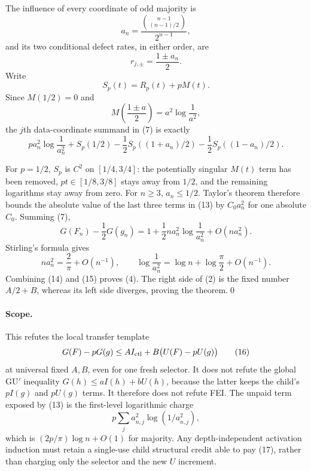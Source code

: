 The influence of every coordinate of odd majority is
\[
 a_n=\frac{\binom{n-1}{(n-1)/2}}{2^{n-1}},            \tag{10}
\]
and its two conditional defect rates, in either order, are
\[
 r_{j,\pm}=\frac{1\pm a_n}{2}.                        \tag{11}
\]
Write
\[
 S_p(t)=R_p(t)+pM(t).
\]
Since $M(1/2)=0$ and
\[
 M\left(\frac{1\pm a}{2}\right)
 =a^2\log\frac1{a^2},                                 \tag{12}
\]
the $j$th data-coordinate summand in (7) is exactly
\[
 p a_n^2\log\frac1{a_n^2}
 +S_p(1/2)-\frac12S_p((1+a_n)/2)-\frac12S_p((1-a_n)/2). \tag{13}
\]

For $p=1/2$, $S_p$ is $C^2$ on $[1/4,3/4]$: the potentially singular
$M(t)$ term has been removed, $pt\in[1/8,3/8]$ stays away from $1/2$, and
the remaining logarithms stay away from zero.  For $n\geq3$, $a_n\leq1/2$.
Taylor's theorem therefore bounds the absolute value of the last three terms
in (13) by $C_0a_n^2$ for one absolute $C_0$.  Summing (7),
\[
 G(F_n)-\frac12G(g_n)
 =1+\frac12 n a_n^2\log\frac1{a_n^2}+O(na_n^2).       \tag{14}
\]
Stirling's formula gives
\[
 na_n^2=\frac2\pi+O(n^{-1}),\qquad
 \log\frac1{a_n^2}=\log n+\log\frac\pi2+O(n^{-1}).  \tag{15}
\]
Combining (14) and (15) proves (4).  The right side of (2) is the fixed
number $A/2+B$, whereas its left side diverges, proving the theorem.\qed

\paragraph{Scope.}
This refutes the local transfer template
\[
 G(F)-pG(g)\leq A I_{\rm ctl}
 +B\bigl(U(F)-pU(g)\bigr)                              \tag{16}
\]
at universal fixed $A,B$, even for one fresh selector.  It does not refute
the global GU$'$ inequality $G(h)\leq aI(h)+bU(h)$, because the latter keeps
the child's $pI(g)$ and $pU(g)$ terms.  It therefore does not refute FEI.
The unpaid term exposed by (13) is the first-level logarithmic charge
\[
 p\sum_j a_{n,j}^2\log(1/a_{n,j}^2),                  \tag{17}
\]
which is $(2p/\pi)\log n+O(1)$ for majority.  Any depth-independent
activation induction must retain a single-use child structural credit able
to pay (17), rather than charging only the selector and the new $U$ increment.
